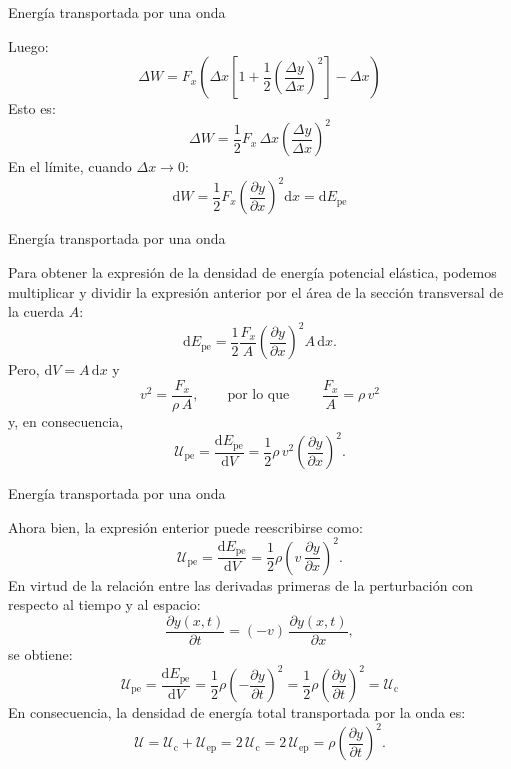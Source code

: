 \documentclass[11pt,handout,aspectratio=1610]{beamer}
\newcommand{\diff}[0]{\text{d}}
\newcommand{\fdiff}[2]{\dfrac{\text{d} #1}{\text{d} #2}}
\newcommand{\pdiff}[2]{\frac{\partial #1}{\partial #2}}
\begin{document}
\begin{frame}{Energía transportada por una onda}

    Luego: $$ \Delta W = F_x \left(\Delta x \left[1 + \frac{1}{2} \left(\frac{\Delta y}{\Delta x}\right)^2\right] - \Delta x\right) $$ Esto es: $$ \Delta W = \frac{1}{2} F_x \, \Delta x \left(\frac{\Delta y}{\Delta x}\right)^2 $$ En el límite, cuando $\Delta x \to 0 $: $$ \diff W = \frac{1}{2} F_x \left(\pdiff{y}{x}\right)^2 \diff x = \diff E_\text{pe} $$

\end{frame}

\begin{frame}{Energía transportada por una onda}

    Para obtener la expresión de la densidad de energía potencial elástica, podemos multiplicar y dividir la expresión anterior por el área de la sección transversal de la cuerda $A$: $$ \diff E_\text{pe} = \frac{1}{2} \frac{F_x}{A} \left(\pdiff{y}{x}\right)^2 A \, \diff x. $$ Pero, $\diff V = A \, \diff x$ y $$ v^2 = \frac{F_x}{\rho \, A}, \qquad \text{por lo que } \qquad \frac{F_x}{A} = \rho \, v^2 $$ y, en consecuencia, $$ \mathcal{U}_\text{pe} = \fdiff{E_\text{pe}}{V} = \frac{1}{2} \rho \, v^2 \left(\pdiff{y}{x}\right)^2. $$

\end{frame}

\begin{frame}{Energía transportada por una onda}

    Ahora bien, la expresión enterior puede reescribirse como: $$ \mathcal{U}_\text{pe} = \fdiff{E_\text{pe}}{V} = \frac{1}{2} \rho \left( v \, \pdiff{y}{x}\right)^2. $$ En virtud de la relación entre las derivadas primeras de la perturbación con respecto al tiempo y al espacio: $$ \pdiff{y(x,t)}{t} = \left(-v\right) \, \pdiff{y(x,t)}{x}, $$ se obtiene: $$ \mathcal{U}_\text{pe} = \fdiff{E_\text{pe}}{V} = \frac{1}{2} \rho \left( - \pdiff{y}{t}\right)^2 = \frac{1}{2} \rho \left(\pdiff{y}{t}\right)^2 = \mathcal{U}_\text{c} $$ En consecuencia, la densidad de energía total transportada por la onda es: $$ \mathcal{U} = \mathcal{U}_\text{c} + \mathcal{U}_\text{ep} = 2 \, \mathcal{U}_\text{c} = 2 \, \mathcal{U}_\text{ep} = \rho \left(\pdiff{y}{t}\right)^2. $$

\end{frame}
\end{document}
